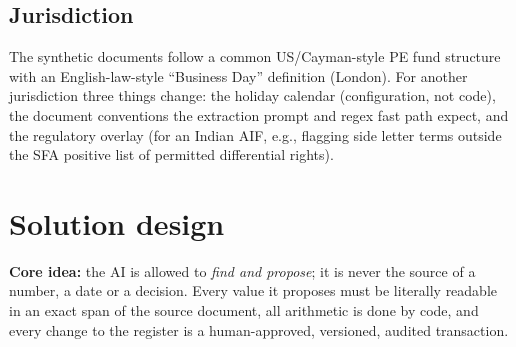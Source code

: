 \documentclass[10pt,a4paper]{article}
\begin{document}
\subsection{Jurisdiction}
The synthetic documents follow a common US/Cayman-style PE fund structure with an English-law-style ``Business Day'' definition (London). For another jurisdiction three things change: the holiday calendar (configuration, not code), the document conventions the extraction prompt and regex fast path expect, and the regulatory overlay (for an Indian AIF, e.g., flagging side letter terms outside the SFA positive list of permitted differential rights).

\newpage
\section{Solution design}
\textbf{Core idea:} the AI is allowed to \emph{find and propose}; it is never the source of a number, a date or a decision. Every value it proposes must be literally readable in an exact span of the source document, all arithmetic is done by code, and every change to the register is a human-approved, versioned, audited transaction.
\end{document}
